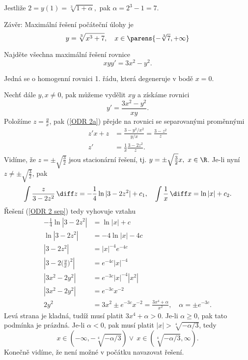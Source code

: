 \documentclass[answers]{exam}
\begin{document}
\begin{questions}
\begin{solution}
		Jestli\v ze $2=y(1)=\sqrt[3]{1+\alpha},$ pak $\alpha=2^3-1=7.$
		
		Z\'av\v er: Maxim\'aln\'i \v re\v sen\'i počáteční úlohy je 
		\begin{equation*}\label{reseni 7}
		y=\sqrt[3]{x^3+7},\quad x\in \parens{-\sqrt[3]{7}, +\infty} 
		\end{equation*}
  \end{solution}
  
  \question
  Najd\v ete v\v sechna maxim\'aln\'i \v re\v sen\'i rovnice
  \begin{equation*}
  xyy'=3x^2-y^2.
  \end{equation*}
	
	\begin{solution}
		Jedn\'a se o homogenn\'i rovnici 1. \v r\'adu, kter\'a degeneruje v bod\v e $x=0$.
		
		Nechť d\'ale $y,x\ne0$, pak m\r u\v zeme vyd\v elit $xy$ a z\'isk\'ame rovnici
		\begin{equation}\label{ODR 2a}
		y'=\frac{3x^2-y^2}{xy}. 
		\end{equation}
		Polo\v z\'ime $z=\frac{y}{x}$, pak (\ref{ODR 2a}) p\v rejde na rovnici se separovan\'ymi prom\v enn\'ymi
		\begin{align}\label{ODR 2 sep}
		z'x+z&=\frac{3-y^2/x^2}{y/x}=\frac{3-z^2}{z}\nonumber\\
		z'&=\frac{1}{x}\frac{3-2z^2}{z}.
		\end{align}
		Vid\'ime, \v ze $z=\pm\sqrt{\frac{3}{2}}$ jsou stacion\'arn\'i \v re\v sen\'i, tj. $y=\pm\sqrt{\frac{3}{2}}x,\ x\in\R$. Je-li nyn\'i $z\ne\pm\sqrt{\frac{3}{2}}$, pak
		\begin{align*}
		\int\frac{z}{3-2z^2}\,\diff z=-\frac{1}{4}\ln|3-2z^2|+c_1,\quad \int\frac{1}{x}\,\diff x=\ln|x|+c_2. 
		\end{align*}
		\v Re\v sen\'i (\ref{ODR 2 sep}) tedy vyhovuje vztahu
		\begin{align*}
		-\frac{1}{4}\ln|3-2z^2|&=\ln|x|+c\\ 
		\ln|3-2z^2|&=-4\ln|x|-4c\\ 
		|3-2z^2|&=|x|^{-4}e^{-4c}\\ 
		|3-2(\frac{y}{x}\big)^2|&=e^{-4c}|x|^{-4}\\
		|3x^2-2y^2|&=e^{-3c}|x|^{-4}|x^2|\\
		|3x^2-2y^2|&=e^{-3c}x^{-2}\\
		2y^2&=3x^2\pm e^{-3c}x^{-2}=\frac{3x^4+\alpha}{x^2},\quad \alpha=\pm e^{-3c}.
		\end{align*}
		Lev\'a strana je kladná, tud\'i\v z mus\'i platit $3x^4+\alpha>0$. Je-li $\alpha\ge0$, pak tato podm\'inka je pr\'azdn\'a. Je-li $\alpha<0$, pak mus\'i platit $|x|>\sqrt[4]{-\alpha/3}$, tedy
		$$x\in(-\infty,-\sqrt[4]{-\alpha/3})\vee\ x\in(\sqrt[4]{-\alpha/3},\infty).$$
		Kone\v cn\v e vid\'ime, \v ze nen\'i mo\v zn\'e v po\v c\'atku navazovat \v re\v sen\'i.
			

\end{solution}
\end{questions}
\end{document}

